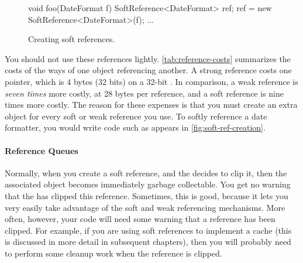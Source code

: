 \begin{figure}
\centering
\begin{framedlisting}
void foo(DateFormat f) {
   SoftReference<DateFormat> ref;
   ref = new SoftReference<DateFormat>(f);
   ...
}
\end{framedlisting}
\caption{Creating soft references.}
\label{fig:soft-ref-creation}
\end{figure}
You should not use these references lightly. \autoref{tab:reference-costs}
summarizes the costs of the ways of one object referencing another. A strong
reference costs one pointer, which is 4 bytes (32 bits) on a 32-bit \jre. In
comparison, a weak reference is \emph{seven times} more costly, at 28 bytes per
reference, and a soft reference is nine times more costly. The reason for these
expenses is that you must create an extra  object for
every soft or weak reference you use. To softly reference a date formatter,
you would write code such as appears in \autoref{fig:soft-ref-creation}.


\paragraph{Reference Queues}
Normally, when you create a soft reference, and the \jre decides to clip it,
then the associated  object becomes immediately garbage
collectable. You get no warning that the \jre has clipped this reference.
Sometimes, this is good, because it lets you very easily take advantage of the
soft and weak referencing mechanisms. More often, however, your code will need
some warning that a reference has been clipped. For example, if you are using
soft references to implement a cache (this is discussed in more detail in
subsequent chapters), then you will probably need to perform some cleanup work
when the reference is clipped.


